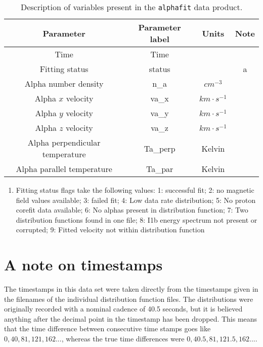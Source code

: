 \documentclass[11pt,a4paper]{article}
\begin{document}
\begin{table}
	\centering
	\begin{tabular}{| c | c | c | c |}
		\hline
		Parameter 					& Parameter label	& Units			& Note 				\\ \hline \hline
		Time						 	& Time			& 				& 			\\ \hline
		Fitting status					& status			& 				& a	\\ \hline
		Alpha number density 			& n\_a			& $cm^{-3}$		&	\\ \hline
		Alpha $x$ velocity		 		& va\_x			& $km\cdot s^{-1}$	& \\ \hline
		Alpha $y$ velocity		 		& va\_y			& $km\cdot s^{-1}$	& \\ \hline
		Alpha $z$ velocity		 		& va\_z			& $km\cdot s^{-1}$	&\\ \hline
		Alpha perpendicular temperature	& Ta\_perp		& Kelvin			&	\\ \hline
		Alpha parallel temperature		& Ta\_par			& Kelvin			&	\\ \hline
	\end{tabular}
	\caption{Description of variables present in the \texttt{alphafit} data product.}	
	\label{tab:variables}
	\small
	\begin{enumerate}[label=\alph*.]
		\item Fitting status flags take the following values: 1: successful fit; 2: no magnetic field values available; 3: failed fit; 4: Low data rate distribution; 5: No proton corefit data available; 6: No alphas present in distribution function; 7: Two distribution functions found in one file; 8: I1b energy spectrum not present or corrupted; 9: Fitted velocity not within distribution function
	\end{enumerate}
\end{table}

\section{A note on timestamps}
The timestamps in this data set were taken directly from the timestamps given in the filenames of the individual distribution function files. The distributions were originally recorded with a nominal cadence of 40.5 seconds, but it is believed anything after the decimal point in the timestamp has been dropped. This means that the time difference between consecutive time stamps goes like $0, 40, 81, 121, 162...$, whereas the true time differences were $0, 40.5, 81, 121.5, 162...$.
\newpage
\appendix
\end{document}
